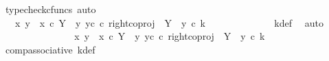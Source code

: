 \begin{isabellebody}
\ {\isacharparenleft}{\kern0pt}typecheck{\isacharunderscore}{\kern0pt}cfuncs{\isacharcomma}{\kern0pt}\ auto{\isacharparenright}{\kern0pt}\isanewline
\ \ \ \ \ \ \ \ \ \ \isamarkupfalse%
\ \isamarkupfalse%
\ {\isachardoublequoteopen}{\isachardot}{\kern0pt}{\isachardot}{\kern0pt}{\isachardot}{\kern0pt}\ {\isacharequal}{\kern0pt}\ {\isacharparenleft}{\kern0pt}{\isasymlangle}x{}{\isacharcomma}{\kern0pt}\ y{}{\isasymrangle}\ {\isasymamalg}\ {\isasymlangle}x{}\ {\isasymcirc}\isactrlsub c\ {\isasymbeta}\isactrlbsub Y\ {\isasymsetminus}\ {\isacharparenleft}{\kern0pt}{\isasymone}{\isacharcomma}{\kern0pt}y{}{\isacharparenright}{\kern0pt}\isactrlesub {\isacharcomma}{\kern0pt}\ y{}\isactrlsup c{\isasymrangle}{\isacharparenright}{\kern0pt}\ {\isasymcirc}\isactrlsub c\ {\isacharparenleft}{\kern0pt}right{\isacharunderscore}{\kern0pt}coproj\ {\isasymone}\ {\isacharparenleft}{\kern0pt}Y\ {\isasymsetminus}\ {\isacharparenleft}{\kern0pt}{\isasymone}{\isacharcomma}{\kern0pt}y{}{\isacharparenright}{\kern0pt}{\isacharparenright}{\kern0pt}\ {\isasymcirc}\isactrlsub c\ k{\isacharparenright}{\kern0pt}{\isachardoublequoteclose}\isanewline
\ \ \ \ \ \ \ \ \ \ \ \ \isamarkupfalse%
\ k{\isacharunderscore}{\kern0pt}def\ \isamarkupfalse%
\ auto\isanewline
\ \ \ \ \ \ \ \ \ \ \isamarkupfalse%
\ \isamarkupfalse%
\ {\isachardoublequoteopen}{\isachardot}{\kern0pt}{\isachardot}{\kern0pt}{\isachardot}{\kern0pt}\ {\isacharequal}{\kern0pt}\ {\isacharparenleft}{\kern0pt}{\isacharparenleft}{\kern0pt}{\isasymlangle}x{}{\isacharcomma}{\kern0pt}\ y{}{\isasymrangle}\ {\isasymamalg}\ {\isasymlangle}x{}\ {\isasymcirc}\isactrlsub c\ {\isasymbeta}\isactrlbsub Y\ {\isasymsetminus}\ {\isacharparenleft}{\kern0pt}{\isasymone}{\isacharcomma}{\kern0pt}y{}{\isacharparenright}{\kern0pt}\isactrlesub {\isacharcomma}{\kern0pt}\ y{}\isactrlsup c{\isasymrangle}{\isacharparenright}{\kern0pt}\ {\isasymcirc}\isactrlsub c\ right{\isacharunderscore}{\kern0pt}coproj\ {\isasymone}\ {\isacharparenleft}{\kern0pt}Y\ {\isasymsetminus}\ {\isacharparenleft}{\kern0pt}{\isasymone}{\isacharcomma}{\kern0pt}y{}{\isacharparenright}{\kern0pt}{\isacharparenright}{\kern0pt}{\isacharparenright}{\kern0pt}\ {\isasymcirc}\isactrlsub c\ k{\isachardoublequoteclose}\isanewline
\ \ \ \ \ \ \ \ \ \ \ \ \isamarkupfalse%
\ comp{\isacharunderscore}{\kern0pt}associative{}\ k{\isacharunderscore}{\kern0pt}def\ \isamarkupfalse%

\end{isabellebody}
